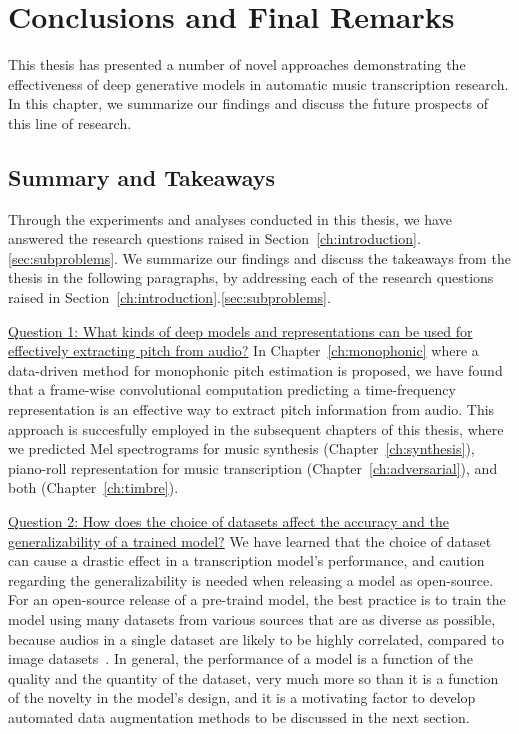 
\graphicspath{{8-conclusions/figures/}}

\chapter{Conclusions and Final Remarks}
\label{ch:conclusions}

This thesis has presented a number of novel approaches demonstrating the effectiveness of deep generative models in automatic music transcription research.
In this chapter, we summarize our findings and discuss the future prospects of this line of research.

\section{Summary and Takeaways}


Through the experiments and analyses conducted in this thesis, we have answered the research questions raised in Section~\ref{ch:introduction}.\ref{sec:subproblems}.
We summarize our findings and discuss the takeaways from the thesis in the following paragraphs, by addressing each of the research questions raised in Section~\ref{ch:introduction}.\ref{sec:subproblems}.

\uline{Question 1: What kinds of deep models and representations can be used for effectively extracting pitch from audio?}
In Chapter~\ref{ch:monophonic} where a data-driven method for monophonic pitch estimation is proposed, we have found that a frame-wise convolutional computation predicting a time-frequency representation is an effective way to extract pitch information from audio.
This approach is succesfully employed in the subsequent chapters of this thesis, where we predicted Mel spectrograms for music synthesis (Chapter~\ref{ch:synthesis}), piano-roll representation for music transcription (Chapter~\ref{ch:adversarial}), and both (Chapter~\ref{ch:timbre}).

\uline{Question 2: How does the choice of datasets affect the accuracy and the generalizability of a trained model?}
We have learned that the choice of dataset can cause a drastic effect in a transcription model's performance, and caution regarding the generalizability is needed when releasing a model as open-source.
For an open-source release of a pre-traind model, the best practice is to train the model using many datasets from various sources that are as diverse as possible, because audios in a single dataset are likely to be highly correlated, compared to image datasets~\cite{thickstun2018invariances}.
In general, the performance of a model is a function of the quality and the quantity of the dataset, very much more so than it is a function of the novelty in the model's design, and it is a motivating factor to develop automated data augmentation methods to be discussed in the next section.


